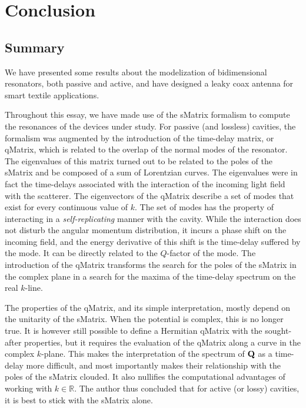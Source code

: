 \chapter{Conclusion}
\section{Summary}
We have presented some results about the modelization of bidimensional
resonators, both passive and active, and have designed a leaky coax
antenna for smart textile applications. 

Throughout this essay, we have made use of the \gls{sMatrix} formalism
to compute the resonances of the devices under study. For passive
(and lossless) cavities, the formalism was augmented by the
introduction of the time-delay matrix, or \gls{qMatrix}, which
is related to the overlap of the normal modes of the resonator.
The eigenvalues of this matrix turned out to be related to the
poles of the \gls{sMatrix} and be composed of a sum of Lorentzian
curves.  The eigenvalues were in fact the time-delays associated with
the interaction of the incoming light field with the scatterer. 
The eigenvectors of the \gls{qMatrix} describe a set of modes that exist for
every continuous value of $k$. The set of modes has the property of 
interacting in a \textit{self-replicating} manner with the cavity. 
While the interaction does not disturb the angular momentum distribution,
it incurs a phase shift on the incoming field, and the energy derivative
of this shift is the time-delay suffered by the mode. It can be directly
related to the $Q$-factor of the mode. The introduction of the 
\gls{qMatrix} transforms the search for the poles of the \gls{sMatrix}
in the complex plane in a search for the maxima of the time-delay spectrum
on the real $k$-line.

The properties of the \gls{qMatrix}, and its simple interpretation, 
mostly depend on the unitarity of the \gls{sMatrix}. When the 
potential is complex, this is no longer true. It is however still
possible to define a Hermitian \gls{qMatrix} with the sought-after properties,
but it requires the evaluation of the \gls{qMatrix} along a curve in 
the complex $k$-plane. This makes the interpretation of the spectrum
of $\mathbf{Q}$ as a time-delay more difficult, and most importantly 
makes their relationship with the poles of the \gls{sMatrix} clouded.
It also nullifies the computational advantages of working with $k\in\mathbb{R}$.
The author thus concluded that for active (or lossy) cavities, it is best
to stick with the \gls{sMatrix} alone. 

